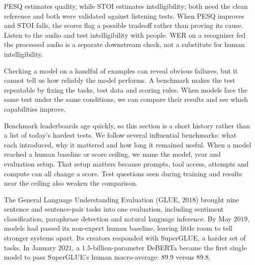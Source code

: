 \metricsecondary

PESQ estimates quality, while STOI estimates intelligibility; both need the clean reference and both were validated against listening
tests. When PESQ improves and STOI falls, the scores flag a possible tradeoff rather than proving its cause. Listen to the audio and test
intelligibility with people. WER on a recognizer fed the processed audio is a separate downstream check, not a substitute
for human intelligibility.

\metricend
\clearpage
\thispagestyle{genaistyle}
\label{sec:benchmarks}
\begingroup
\setlength{\metricheadingbefore}{6pt}
\setlength{\metricheadingafter}{-1.5pt}


Checking a model on a handful of examples can reveal obvious failures, but it cannot tell us how reliably the model performs. A benchmark
makes the test repeatable by fixing the tasks, test data and scoring rules. When models face the same test under the same conditions, we
can compare their results and see which capabilities improve.

Benchmark leaderboards age quickly, so this section is a short history rather than a list of today's hardest tests. We follow several
influential benchmarks: what each introduced, why it mattered and how long it remained useful. When a model reached a human baseline or
score ceiling, we name the model, year and evaluation setup. That setup matters because prompts, tool access, attempts and compute can all
change a score. Test questions seen during training and results near the ceiling also weaken the comparison.


The General Language Understanding Evaluation (GLUE, $2018$) brought nine sentence and sentence-pair tasks into one evaluation, including
sentiment classification, paraphrase detection and natural language inference. By May $2019$, models had passed its non-expert human
baseline, leaving little room to tell stronger systems apart. Its creators responded with SuperGLUE, a harder set of tasks. In January
$2021$, a $1.5$-billion-parameter DeBERTa became the first single model to pass SuperGLUE's human macro-average: $89.9$ versus $89.8$.

